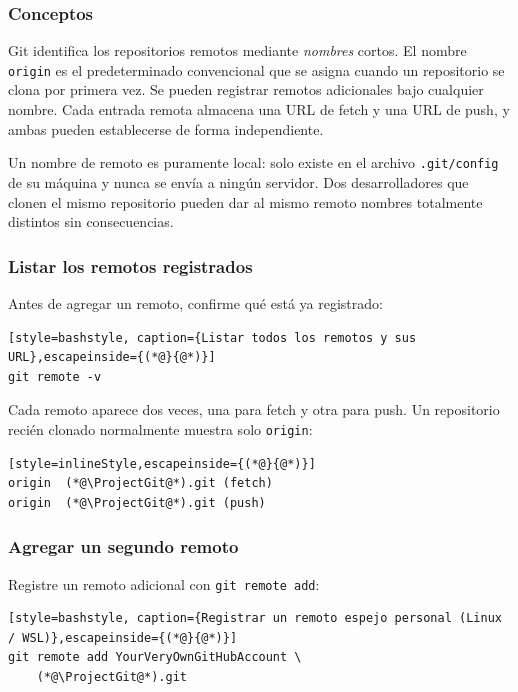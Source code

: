 \subsubsection{Conceptos}

Git identifica los repositorios remotos mediante \emph{nombres} cortos. El nombre
\texttt{origin} es el predeterminado convencional que se asigna cuando un repositorio
se clona por primera vez. Se pueden registrar remotos adicionales bajo cualquier nombre.
Cada entrada remota almacena una URL de fetch y una URL de push, y ambas pueden
establecerse de forma independiente.

\begin{infobox}
Un nombre de remoto es puramente local: solo existe en el
archivo \texttt{.git/config} de su máquina y nunca se envía a ningún
servidor. Dos desarrolladores que clonen el mismo repositorio pueden dar al mismo
remoto nombres totalmente distintos sin consecuencias.
\end{infobox}

\subsubsection{Listar los remotos registrados}

Antes de agregar un remoto, confirme qué está ya registrado:

\begin{lstlisting}[style=bashstyle, caption={Listar todos los remotos y sus URL},escapeinside={(*@}{@*)}]
git remote -v
\end{lstlisting}

Cada remoto aparece dos veces, una para fetch y otra para push. Un repositorio
recién clonado normalmente muestra solo \texttt{origin}:

\begin{lstlisting}[style=inlineStyle,escapeinside={(*@}{@*)}]
origin  (*@\ProjectGit@*).git (fetch)
origin  (*@\ProjectGit@*).git (push)
\end{lstlisting}

\subsubsection{Agregar un segundo remoto}

Registre un remoto adicional con \texttt{git remote add}:

\begin{lstlisting}[style=bashstyle, caption={Registrar un remoto espejo personal (Linux / WSL)},escapeinside={(*@}{@*)}]
git remote add YourVeryOwnGitHubAccount \
    (*@\ProjectGit@*).git
\end{lstlisting}

